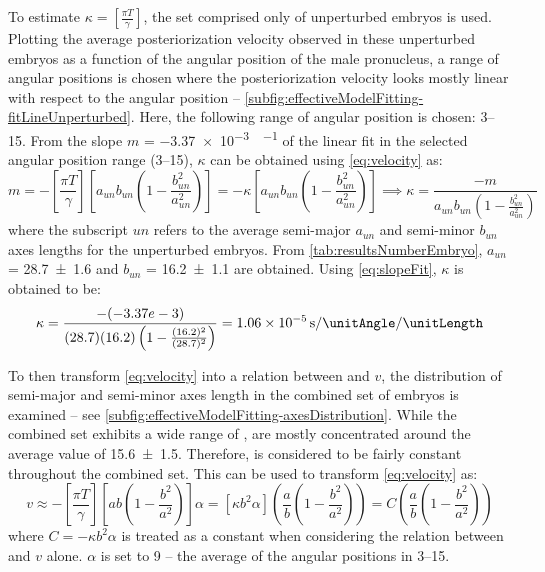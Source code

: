 To estimate $\kappa = \left[\frac{\pi T}{\gamma}\right]$, the set comprised only of unperturbed embryos is used. Plotting the average posteriorization velocity observed in these unperturbed embryos as a function of the angular position of the male pronucleus, a range of angular positions is chosen where the posteriorization velocity looks mostly linear with respect to the angular position -- \autoref{subfig:effectiveModelFitting-fitLineUnperturbed}. Here, the following range of angular position is chosen: \SIrange{3}{15}{\unitAngle}. From the slope $m$ = \SI{-3.37e-3}{\unitPostVel\per\unitAngle} of the linear fit in the selected angular position range (\SIrange{3}{15}{\unitAngle}), $\kappa$ can be obtained using \eqref{eq:velocity} as:
\begin{equation} \label{eq:slopeFit}
    m = - \left[\frac{\pi T}{\gamma}\right] \left[a_{un}b_{un}\left(1 - \frac{b_{un}^2}{a_{un}^2}\right)\right] = - \kappa \left[a_{un}b_{un}\left(1 - \frac{b_{un}^2}{a_{un}^2}\right)\right] \implies \kappa = \frac{-m}{a_{un}b_{un}\left(1 - \frac{b_{un}^2}{a_{un}^2}\right)}
\end{equation}
where the subscript $un$ refers to the average semi-major $a_{un}$ and semi-minor $b_{un}$ axes lengths for the unperturbed embryos. From \autoref{tab:resultsNumberEmbryo}, $a_{un}$ = \SI{28.7 +- 1.6}{\unitLength} and $b_{un}$ = \SI{16.2 +- 1.1}{\unitLength} are obtained. Using \eqref{eq:slopeFit}, $\kappa$ is obtained to be:
\begin{equation}\label{eq:kappa}
    \kappa = \frac{-(-3.37e-3)}{(28.7)(16.2)\left(1 - \frac{(16.2)^2}{(28.7)^2}\right)} = \SI{1.06e-5}{\per\second\per\unitAngle\per\unitLength}
\end{equation}

To then transform \eqref{eq:velocity} into a relation between \aspectRatio and $v$, the distribution of semi-major \longAxisLength and semi-minor \shortAxisLength axes length in the combined set of embryos is examined -- see \autoref{subfig:effectiveModelFitting-axesDistribution}. While the combined set exhibits a wide range of \longAxisLength, \shortAxisLength are mostly concentrated around the average value of \SI{15.6 +- 1.5}{\unitLength}. Therefore, \shortAxisLength is considered to be fairly constant throughout the combined set. This can be used to transform \eqref{eq:velocity} as:
\begin{equation} \label{eq:scalingRelation}
    v \approx - \left[\frac{\pi T}{\gamma}\right] \left[ab\left(1 - \frac{b^2}{a^2}\right)\right]\alpha = [\kappa b^2 \alpha] \left(\frac{a}{b}\left(1 - \frac{b^2}{a^2}\right)\right) = C \left(\frac{a}{b}\left(1 - \frac{b^2}{a^2}\right)\right)
\end{equation}
where $C = -\kappa b^2 \alpha$ is treated as a constant when considering the relation between \aspectRatio and $v$ alone. $\alpha$ is set to \SI{9}{\unitAngle} -- the average of the angular positions in \SIrange{3}{15}{\unitAngle}.

